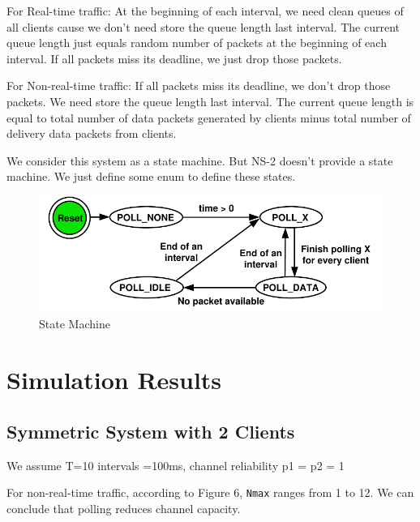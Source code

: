 \documentclass{article}
\begin{document}
For Real-time traffic: At the beginning of each interval, we need clean queues of all clients cause we don't need store the queue length last interval. The current queue length just equals random number of packets at the beginning of each interval. If all packets miss its deadline, we just drop those packets.

For Non-real-time traffic:  If all packets miss its deadline, we don't drop those packets. We need store the queue length last interval. The current queue length is equal to total number of data packets generated by clients minus total number of delivery data packets from clients. 

We consider this system as a state machine. But NS-2 doesn't provide a state machine. We just define some enum to define these states. 

\begin{figure}[H]
\centering
\includegraphics[scale=0.8]{state_machine.pdf}
\caption{State Machine}
\end{figure}


\section{Simulation Results}
\label{section: simulation}
\subsection{Symmetric System with 2 Clients}
We assume T=10 intervals =100ms, channel reliability p1 = p2 = 1

For non-real-time traffic, according to Figure 6, \lstinline |Nmax| ranges from 1 to 12. We can conclude that polling reduces channel capacity. 
\end{document}
